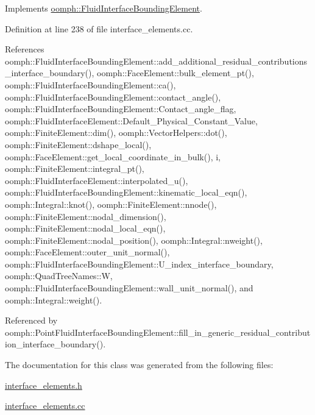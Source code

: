 Implements \hyperlink{classoomph_1_1FluidInterfaceBoundingElement_a69fa099e0cbfe8ae028a4edc77fedc60}{oomph\+::\+Fluid\+Interface\+Bounding\+Element}.



Definition at line 238 of file interface\+\_\+elements.\+cc.



References oomph\+::\+Fluid\+Interface\+Bounding\+Element\+::add\+\_\+additional\+\_\+residual\+\_\+contributions\+\_\+interface\+\_\+boundary(), oomph\+::\+Face\+Element\+::bulk\+\_\+element\+\_\+pt(), oomph\+::\+Fluid\+Interface\+Bounding\+Element\+::ca(), oomph\+::\+Fluid\+Interface\+Bounding\+Element\+::contact\+\_\+angle(), oomph\+::\+Fluid\+Interface\+Bounding\+Element\+::\+Contact\+\_\+angle\+\_\+flag, oomph\+::\+Fluid\+Interface\+Element\+::\+Default\+\_\+\+Physical\+\_\+\+Constant\+\_\+\+Value, oomph\+::\+Finite\+Element\+::dim(), oomph\+::\+Vector\+Helpers\+::dot(), oomph\+::\+Finite\+Element\+::dshape\+\_\+local(), oomph\+::\+Face\+Element\+::get\+\_\+local\+\_\+coordinate\+\_\+in\+\_\+bulk(), i, oomph\+::\+Finite\+Element\+::integral\+\_\+pt(), oomph\+::\+Fluid\+Interface\+Element\+::interpolated\+\_\+u(), oomph\+::\+Fluid\+Interface\+Bounding\+Element\+::kinematic\+\_\+local\+\_\+eqn(), oomph\+::\+Integral\+::knot(), oomph\+::\+Finite\+Element\+::nnode(), oomph\+::\+Finite\+Element\+::nodal\+\_\+dimension(), oomph\+::\+Finite\+Element\+::nodal\+\_\+local\+\_\+eqn(), oomph\+::\+Finite\+Element\+::nodal\+\_\+position(), oomph\+::\+Integral\+::nweight(), oomph\+::\+Face\+Element\+::outer\+\_\+unit\+\_\+normal(), oomph\+::\+Fluid\+Interface\+Bounding\+Element\+::\+U\+\_\+index\+\_\+interface\+\_\+boundary, oomph\+::\+Quad\+Tree\+Names\+::W, oomph\+::\+Fluid\+Interface\+Bounding\+Element\+::wall\+\_\+unit\+\_\+normal(), and oomph\+::\+Integral\+::weight().



Referenced by oomph\+::\+Point\+Fluid\+Interface\+Bounding\+Element\+::fill\+\_\+in\+\_\+generic\+\_\+residual\+\_\+contribution\+\_\+interface\+\_\+boundary().



The documentation for this class was generated from the following files\+:\begin{DoxyCompactItemize}
\item 
\hyperlink{interface__elements_8h}{interface\+\_\+elements.\+h}\item 
\hyperlink{interface__elements_8cc}{interface\+\_\+elements.\+cc}\end{DoxyCompactItemize}
